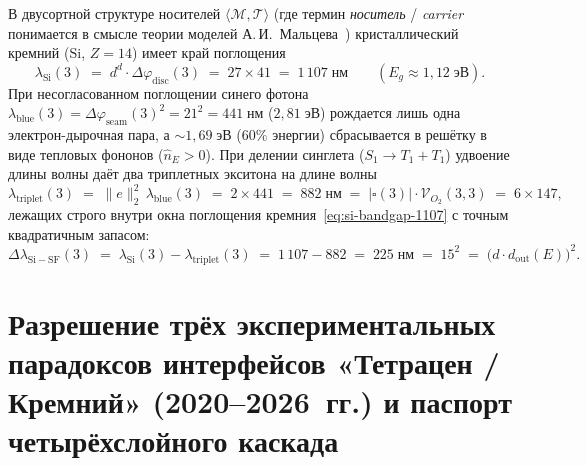 \documentclass[11pt,a4paper]{article}
\theoremstyle{plain}
\theoremstyle{definition}
\begin{document}
В двусортной структуре носителей $\langle\mathcal{M},\mathcal{T}\rangle$ (где термин \emph{носитель} / \emph{carrier} понимается в смысле теории моделей А.\,И.~Мальцева~\cite{Malcev1970}) кристаллический кремний ($\mathrm{Si}$, $Z = 14$) имеет край поглощения
\begin{equation}
  \label{eq:si-bandgap-1107}
  \lambda_{\mathrm{Si}}(3) \;=\; d^d\cdot\Delta\varphi_{\mathrm{disc}}(3) \;=\; 27\times 41 \;=\; 1\,107\;\text{нм} \qquad (E_g\approx 1{,}12\;\text{эВ}).
\end{equation}
При несогласованном поглощении синего фотона $\lambda_{\mathrm{blue}}(3) = \Delta\varphi_{\mathrm{seam}}(3)^2 = 21^2 = 441\;\text{нм}$ ($2{,}81\;\text{эВ}$) рождается лишь одна электрон-дырочная пара, а $\sim 1{,}69\;\text{эВ}$ ($60\%$ энергии) сбрасывается в решётку в виде тепловых фононов ($\hat{n}_E > 0$). При делении синглета ($S_1\to T_1 + T_1$) удвоение длины волны даёт два триплетных экситона на длине волны
\begin{equation}
  \label{eq:triplet-882}
  \lambda_{\mathrm{triplet}}(3) \;=\; \|e\|_2^2\,\lambda_{\mathrm{blue}}(3) \;=\; 2\times 441 \;=\; 882\;\text{нм} \;=\; |\square(3)|\cdot\mathcal{V}_{O_2}(3,3) \;=\; 6\times 147,
\end{equation}
лежащих строго внутри окна поглощения кремния~\eqref{eq:si-bandgap-1107} с точным квадратичным запасом:
\begin{equation}
  \label{eq:sf-margin-225}
  \Delta\lambda_{\mathrm{Si-SF}}(3) \;=\; \lambda_{\mathrm{Si}}(3) - \lambda_{\mathrm{triplet}}(3) \;=\; 1\,107 - 882 \;=\; 225\;\text{нм} \;=\; 15^2 \;=\; \bigl(d\cdot d_{\mathrm{out}}(E)\bigr)^2.
\end{equation}

\section{Разрешение трёх экспериментальных парадоксов интерфейсов «Тетрацен / Кремний» (2020--2026~гг.) и паспорт четырёхслойного каскада}
\label{sec:three-paradoxes}
\end{document}

